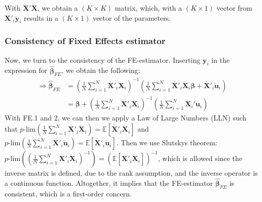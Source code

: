 With $\pmb{\ddot{X}}'\pmb{\ddot{X}}$, we obtain a $(K \times K)$ matrix, which, with a $(K \times 1)$ vector from $\pmb{\ddot{X'}}_{i} \pmb{\ddot{y}}_{i}$ results in a $(K \times 1)$ vector of the parameters.

\subsubsection*{Consistency of Fixed Effects estimator}
Now, we turn to the consistency of the FE-estimator. Inserting $\pmb{\ddot{y}}_i$ in the expression for $\pmb{\hat{\beta}}_{FE}$, we obtain the following:
\begin{align*}
    \Rightarrow \pmb{\hat{\beta}}_{FE} &= \left( \frac{1}{N} \sum_{i=1}^N {\pmb{\ddot{X'}}_{i} \pmb{\ddot{X}}_{i} } \right) ^{-1} \left(\frac{1}{N} \sum_{i=1}^N {\pmb{\ddot{X'}}_{i}}\pmb{\ddot{X}}_{i} \pmb{\beta}+\pmb{\ddot{X'}}_{i}\pmb{\ddot{u}}_i \right) \\
    &= \pmb{\beta} +\left( \frac{1}{N} \sum_{i=1}^N {\pmb{\ddot{X'}}_{i} \pmb{\ddot{X}}_{i} } \right) ^{-1} \left( \frac{1}{N} \sum_{i=1}^N {\pmb{\ddot{X}}_i' \pmb{\ddot{u}}_i} \right)
\end{align*}
With FE.1 and 2, we can then we apply a Law of Large Numbers (LLN) such that $p\text{-lim}\left(\frac{1}{N} \sum_{i=1}^N {\pmb{\ddot{X'}}_{i} \pmb{\ddot{X}}_{i} } \right)=\mathbb{E}[\pmb{\ddot{X'}}_{i} \pmb{\ddot{X}}_{i}]$ and $p\text{-lim}\left(\frac{1}{N} \sum_{i=1}^N {\pmb{\ddot{X'}}_{i} \pmb{\ddot{u}}_{i} } \right)=\mathbb{E}[\pmb{\ddot{X'}}_{i} \pmb{\ddot{u}}_{i}]$. Then we use Slutskys theorem: $p\text{-lim}\left( \left(\frac{1}{N} \sum_{i=1}^N {\pmb{\ddot{X'}}_{i} \pmb{\ddot{X}}_{i} } \right)^{-1}\right)=(\mathbb{E}[\pmb{\ddot{X'}}_{i} \pmb{\ddot{X}}_{i}])^{-1}$, which is allowed since the inverse matrix is defined, due to the rank assumption, and the inverse operator is a continuous function. Altogether, it implies that the FE-estimator $\pmb{\hat{\beta}}_{FE}$ is consistent, which is a first-order concern.

